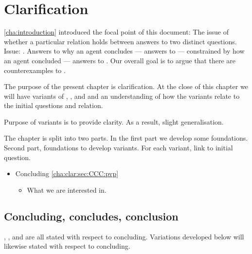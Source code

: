 \chapter{Clarification}
\label{cha:clar}

\begin{note}
  \autoref{cha:introduction} introduced the focal point of this document:
  The issue of whether a particular relation holds between answers to two distinct questions.
  Issue: \issueInclusion{}.
  Answers to why an agent concludes  --- answers to \qWhy{} --- constrained by how an agent concluded --- answers to \qHow{}.
  Our overall goal is to argue that there are counterexamples to \issueInclusion{}.

  The purpose of the present chapter is clarification.
  At the close of this chapter we will have variants of \qWhy{}, \qHow{}, and \issueInclusion{} and an understanding of how the variants relate to the initial questions and relation.

  Purpose of variants is to provide clarity.
  As a result, slight generalisation.
\end{note}

\begin{note}
  The chapter is split into two parts.
  In the first part we develop some foundations.
  Second part, foundations to develop variants.
  For each variant, link to initial question.

  \begin{itemize}
  \item
    Concluding \hfill \autoref{cha:clar:sec:CCC:pvp}
    \begin{itemize}
    \item
      What we are interested in.
    \end{itemize}
  \end{itemize}
\end{note}

\section{Concluding, concludes, conclusion}
\label{cha:clar:sec:CCC}

\begin{note}
  \qWhy{}, \qHow{}, and \issueInclusion{} are all stated with respect to concluding.
  Variations developed below will likewise stated with respect to concluding.
\end{note}

